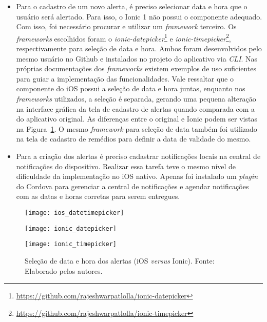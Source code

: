 \begin{itemize}
	\begin{itemize}
		\item Para o cadastro de um novo alerta, é preciso selecionar data e hora que o usuário será alertado. Para isso, o Ionic 1 não possui o componente adequado. Com isso, foi necessário procurar 
		e utilizar um \textit{framework} terceiro. Os \textit{frameworks} escolhidos foram o \textit{ionic-datepicker}\footnote{\url{https://github.com/rajeshwarpatlolla/ionic-datepicker}} e 
		\textit{ionic-timepicker}\footnote{\url{https://github.com/rajeshwarpatlolla/ionic-timepicker}}, respectivamente para seleção de data e hora. Ambos foram desenvolvidos pelo mesmo usuário no Github 
		e instalados no projeto do aplicativo via \textit{CLI}. Nas próprias documentações dos \textit{frameworks} existem exemplos de uso suficientes para guiar a implementação das funcionalidades. 
		Vale ressaltar que o componente do iOS possui a seleção de data e hora juntas, enquanto nos \textit{frameworks} utilizados, a seleção é separada, gerando uma pequena alteração na interface gráfica 
		da tela de cadastro de alertas quando comparada com a do aplicativo original. As diferenças entre o original e Ionic podem ser vistas na Figura~\ref{fig:dateTimePicker}. O mesmo \textit{framework}
		para seleção de data também foi utilizado na tela de cadastro de remédios para definir a data de validade do mesmo.

		\item Para a criação dos alertas é preciso cadastrar notificações locais na central de notificações do dispositivo. Realizar essa tarefa teve o mesmo nível de dificuldade da implementação no iOS nativo. 
		Apenas foi instalado um \textit{plugin} do Cordova para gerenciar a central de notificações e agendar notificações com as datas e horas corretas para serem entregues. 
	\end{itemize}

	\begin{figure}[H]
		\centering
		\begin{minipage}{.33\textwidth}
			\centering
			\texttt{[image: ios\_datetimepicker]}
		\end{minipage}%
		\begin{minipage}{.33\textwidth}
			\centering
			\texttt{[image: ionic\_datepicker]}
		\end{minipage}
		\begin{minipage}{.33\textwidth}
			\centering
			\texttt{[image: ionic\_timepicker]}
		\end{minipage}
	\caption[Seleção de data e hora dos alertas (iOS \textit{versus} Ionic)]{ Seleção de data e hora dos alertas (iOS \textit{versus} Ionic). Fonte: Elaborado pelos autores.}
	\label{fig:dateTimePicker}
	\end{figure}
 	

\end{itemize}
